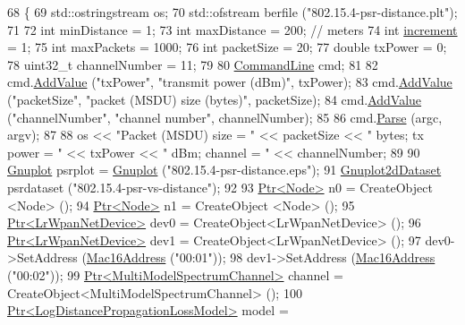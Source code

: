 \begin{DoxyCode}
68 \{
69   std::ostringstream os;
70   std::ofstream berfile (\textcolor{stringliteral}{"802.15.4-psr-distance.plt"});
71 
72   \textcolor{keywordtype}{int} minDistance = 1;
73   \textcolor{keywordtype}{int} maxDistance = 200;  \textcolor{comment}{// meters}
74   \textcolor{keywordtype}{int} \hyperlink{mmwave-amc-test2_8cc_ac504dff76b24ab9f15536c51aec9fbbb}{increment} = 1;
75   \textcolor{keywordtype}{int} maxPackets = 1000;
76   \textcolor{keywordtype}{int} packetSize = 20;
77   \textcolor{keywordtype}{double} txPower = 0;
78   uint32\_t channelNumber = 11;
79 
80   \hyperlink{classns3_1_1CommandLine}{CommandLine} cmd;
81 
82   cmd.\hyperlink{classns3_1_1CommandLine_addcfb546c7ad4c8bd0965654d55beb8e}{AddValue} (\textcolor{stringliteral}{"txPower"}, \textcolor{stringliteral}{"transmit power (dBm)"}, txPower);
83   cmd.\hyperlink{classns3_1_1CommandLine_addcfb546c7ad4c8bd0965654d55beb8e}{AddValue} (\textcolor{stringliteral}{"packetSize"}, \textcolor{stringliteral}{"packet (MSDU) size (bytes)"}, packetSize);
84   cmd.\hyperlink{classns3_1_1CommandLine_addcfb546c7ad4c8bd0965654d55beb8e}{AddValue} (\textcolor{stringliteral}{"channelNumber"}, \textcolor{stringliteral}{"channel number"}, channelNumber);
85 
86   cmd.\hyperlink{classns3_1_1CommandLine_a5c10b85b3207e5ecb48d907966923156}{Parse} (argc, argv);
87 
88   os << \textcolor{stringliteral}{"Packet (MSDU) size = "} << packetSize << \textcolor{stringliteral}{" bytes; tx power = "} << txPower << \textcolor{stringliteral}{" dBm; channel = "} << 
      channelNumber;
89 
90   \hyperlink{classns3_1_1Gnuplot}{Gnuplot} psrplot = \hyperlink{classns3_1_1Gnuplot}{Gnuplot} (\textcolor{stringliteral}{"802.15.4-psr-distance.eps"});
91   \hyperlink{classns3_1_1Gnuplot2dDataset}{Gnuplot2dDataset} psrdataset (\textcolor{stringliteral}{"802.15.4-psr-vs-distance"});
92 
93   \hyperlink{classns3_1_1Ptr}{Ptr<Node>} n0 = CreateObject <Node> ();
94   \hyperlink{classns3_1_1Ptr}{Ptr<Node>} n1 = CreateObject <Node> ();
95   \hyperlink{classns3_1_1Ptr}{Ptr<LrWpanNetDevice>} dev0 = CreateObject<LrWpanNetDevice> ();
96   \hyperlink{classns3_1_1Ptr}{Ptr<LrWpanNetDevice>} dev1 = CreateObject<LrWpanNetDevice> ();
97   dev0->SetAddress (\hyperlink{classns3_1_1Mac16Address}{Mac16Address} (\textcolor{stringliteral}{"00:01"}));
98   dev1->SetAddress (\hyperlink{classns3_1_1Mac16Address}{Mac16Address} (\textcolor{stringliteral}{"00:02"}));
99   \hyperlink{classns3_1_1Ptr}{Ptr<MultiModelSpectrumChannel>} channel = 
      CreateObject<MultiModelSpectrumChannel> ();
100   \hyperlink{classns3_1_1Ptr}{Ptr<LogDistancePropagationLossModel>} model = 

\end{DoxyCode}
